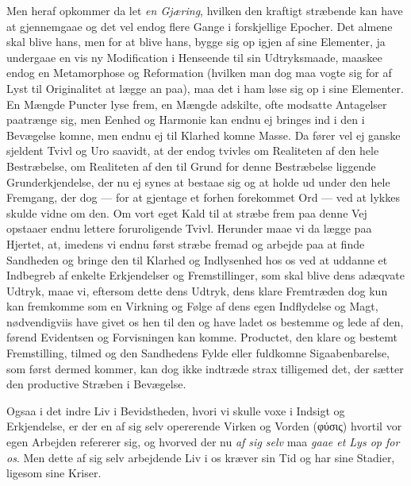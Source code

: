 \documentclass[12pt,a4paper]{book}
\newcommand{\apage}[1]{\marginnote{\footnotesize\textit{[#1]}}}
\begin{document}
Men heraf opkommer da let \emph{en Gjæring}, hvilken den kraftigt stræbende kan have at
gjennemgaae og det vel endog flere Gange i forskjellige Epocher. Det almene skal
blive hans, men for at blive hans, bygge sig op igjen af sine Elementer, ja
undergaae en vis ny Modification i Henseende til sin Udtryksmaade, maaskee endog en
Metamorphose og Reformation (hvilken man dog maa vogte sig for af Lyst til
Originalitet at lægge an paa), maa det i ham løse sig op i sine Elementer. En
Mængde Puncter lyse frem, en Mængde adskilte, ofte modsatte Antagelser paatrænge
sig, men Eenhed og Harmonie kan endnu ej bringes ind i den i Bevægelse komne, men
endnu ej til Klarhed komne Masse. Da fører vel ej ganske sjeldent Tvivl og Uro
saavidt, at der endog tvivles om Realiteten af den hele Bestræbelse, om Realiteten
af den til Grund for denne Bestræbelse liggende Grunderkjendelse, der nu ej \apage{190} synes
at bestaae sig og at holde ud under den hele Fremgang, der dog --- for at gjentage
et forhen forekommet Ord --- ved at lykkes skulde vidne om den. Om vort eget Kald
til at stræbe frem paa denne Vej opstaaer endnu lettere foruroligende Tvivl.
Herunder maae vi da lægge paa Hjertet, at, imedens vi endnu først stræbe fremad og
arbejde paa at finde Sandheden og bringe den til Klarhed og Indlysenhed hos os ved
at uddanne et Indbegreb af enkelte Erkjendelser og Fremstillinger, som skal blive
dens adæqvate Udtryk, maae vi, eftersom dette dens Udtryk, dens klare Fremtræden
dog kun kan fremkomme som en Virkning og Følge af dens egen Indflydelse og Magt,
nødvendigviis have givet os hen til den og have ladet os bestemme og lede af den,
førend Evidentsen og Forvisningen kan komme. Productet, den klare og bestemt
Fremstilling, tilmed og den Sandhedens Fylde eller fuldkomne Sigaabenbarelse, som
først dermed kommer, kan dog ikke indtræde strax tilligemed det, der sætter den
productive Stræben i Bevægelse.

Ogsaa i det indre Liv i Bevidstheden, hvori vi skulle voxe i Indsigt og
Erkjendelse, er der en af sig selv opererende Virken og Vorden (φύσις) hvortil vor
egen Arbejden refererer sig, og hvorved der nu \emph{af sig selv} maa \emph{gaae et Lys op for
os}. Men dette af sig selv arbejdende Liv \apage{191} i os kræver sin Tid og har sine Stadier,
ligesom sine Kriser.
\end{document}
